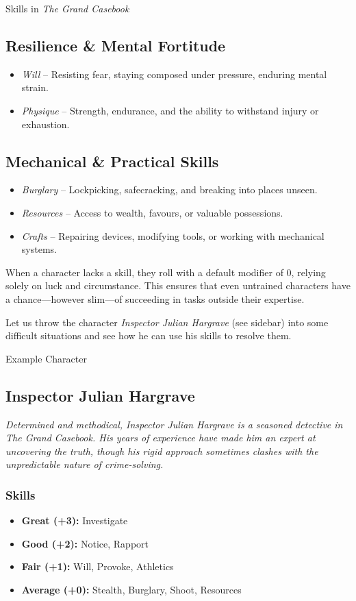 \begin{DndSidebar}[float=!b]{Skills in \emph{The Grand Casebook}}
\subsection*{Resilience \& Mental Fortitude}  
\begin{itemize}
    \item \emph{Will} – Resisting fear, staying composed under pressure, enduring mental strain.
    \item \emph{Physique} – Strength, endurance, and the ability to withstand injury or exhaustion.
\end{itemize}

\subsection*{Mechanical \& Practical Skills}  
\begin{itemize}
    \item \emph{Burglary} – Lockpicking, safecracking, and breaking into places unseen.
    \item \emph{Resources} – Access to wealth, favours, or valuable possessions.
    \item \emph{Crafts} – Repairing devices, modifying tools, or working with mechanical systems.
\end{itemize}
\end{DndSidebar}

When a character lacks a skill, they roll with a default modifier of 0, relying solely on luck and circumstance. This ensures that even untrained characters have a chance—however slim—of succeeding in tasks outside their expertise.

Let us throw the character \emph{Inspector Julian Hargrave} (see sidebar) into some difficult situations and see how he can use his skills to resolve them.

\begin{DndSidebar}[float=!t]{Example Character}
\subsection{Inspector Julian Hargrave}
\emph{Determined and methodical, Inspector Julian Hargrave is a seasoned detective in The Grand Casebook. His years of experience have made him an expert at uncovering the truth, though his rigid approach sometimes clashes with the unpredictable nature of crime-solving.}
\subsubsection*{Skills}
\begin{itemize}
    \item \textbf{Great (+3):} Investigate
    \item \textbf{Good (+2):} Notice, Rapport
    \item \textbf{Fair (+1):} Will, Provoke, Athletics
    \item \textbf{Average (+0):} Stealth, Burglary, Shoot, Resources
\end{itemize}
\end{DndSidebar}

